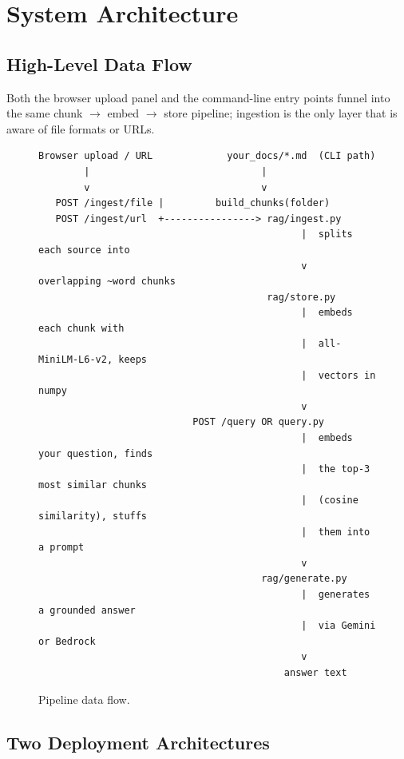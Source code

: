 \documentclass[11pt,a4paper]{paper}
\begin{document}
\section{System Architecture}
\label{sec:architecture}

\subsection{High-Level Data Flow}

Both the browser upload panel and the command-line entry points funnel into the same chunk $\rightarrow$ embed $\rightarrow$ store pipeline; ingestion is the only layer that is aware of file formats or URLs.

\begin{figure}[h]
\centering
\begin{Verbatim}[frame=single, fontsize=\small, numbers=none]
Browser upload / URL             your_docs/*.md  (CLI path)
        |                              |
        v                              v
   POST /ingest/file |         build_chunks(folder)
   POST /ingest/url  +----------------> rag/ingest.py
                                              |  splits each source into
                                              v  overlapping ~word chunks
                                        rag/store.py
                                              |  embeds each chunk with
                                              |  all-MiniLM-L6-v2, keeps
                                              |  vectors in numpy
                                              v
                           POST /query OR query.py
                                              |  embeds your question, finds
                                              |  the top-3 most similar chunks
                                              |  (cosine similarity), stuffs
                                              |  them into a prompt
                                              v
                                       rag/generate.py
                                              |  generates a grounded answer
                                              |  via Gemini or Bedrock
                                              v
                                           answer text
\end{Verbatim}
\caption{Pipeline data flow.}
\label{fig:pipeline}
\end{figure}

\subsection{Two Deployment Architectures}
\end{document}
